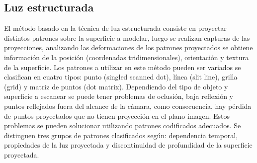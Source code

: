 \subsection{Luz estructurada}

El método basado en la técnica de luz estructurada consiste en proyectar distintos patrones sobre la superficie a modelar, luego se realizan capturas de las proyecciones, analizando las deformaciones de los patrones proyectados se obtiene información de la posición (coordenadas tridimensionales), orientación y textura de la superficie\cite{SLightPatterns}.
Los patrones a utilizar en este método pueden ser variados se clasifican en cuatro tipos: punto (singled scanned dot), línea (slit line), grilla (grid) y matriz de puntos (dot matrix).
Dependiendo del tipo de objeto y superficie a escanear se puede tener problemas de oclusión, baja reflexión y puntos reflejados fuera del alcance de la cámara, como consecuencia, hay pérdida de puntos proyectados que no tienen proyección en el plano imagen.
Estos problemas se pueden solucionar utilizando patrones codificados adecuados. Se distinguen tres grupos de patrones clasificados según: dependencia temporal, propiedades de la luz proyectada y discontinuidad de profundidad de la superficie proyectada\cite{SLightCorrespondence}.
